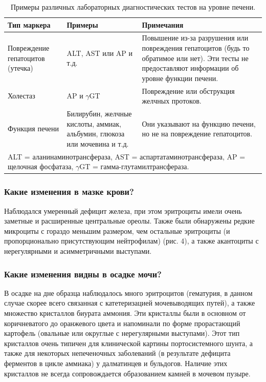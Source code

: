 \documentclass[a4paper,12pt]{book}
\begin{document}
\begin{table}[htbp]
\centering
\caption{Примеры различных лабораторных диагностических тестов на уровне печени.}
\begin{tabular}{p{3cm}p{4cm}p{7cm}}
\toprule
Тип маркера & Примеры & Примечания \\
\midrule
Повреждение гепатоцитов (утечка) & ALT, AST или AP и т.д. & Повышение из-за разрушения или повреждения гепатоцитов (будь то обратимое или нет). Эти тесты не предоставляют информации об уровне функции печени. \\
Холестаз & AP и $\gamma$GT & Повреждение или обструкция желчных протоков. \\
Функция печени & Билирубин, желчные кислоты, аммиак, альбумин, глюкоза или мочевина и т.д. & Они указывают на функцию печени, но не на повреждение гепатоцитов. \\
\bottomrule
\multicolumn{3}{l}{ALT = аланинаминотрансфераза, AST = аспартатаминотрансфераза, AP = щелочная фосфатаза, $\gamma$GT = гамма-глутамилтрансфераза.}
\end{tabular}
\end{table}

\subsubsection*{Какие изменения в мазке крови?}
Наблюдался умеренный дефицит железа, при этом эритроциты имели очень заметные и расширенные центральные ореолы. Также были обнаружены редкие микроциты с гораздо меньшим размером, чем остальные эритроциты (и пропорционально присутствующим нейтрофилам) (рис. 4), а также акантоциты с нерегулярными и асимметричными выступами.

\subsubsection*{Какие изменения видны в осадке мочи?}
В осадке на дне образца наблюдалось много эритроцитов (гематурия, в данном случае скорее всего связанная с катетеризацией мочевыводящих путей), а также множество кристаллов биурата аммония. Эти кристаллы были в основном от коричневатого до оранжевого цвета и напоминали по форме прорастающий картофель (овальные или округлые с нерегулярными выступами). Этот тип кристаллов очень типичен для клинической картины портосистемного шунта, а также для некоторых непеченочных заболеваний (в результате дефицита ферментов в цикле аммиака) у далматинцев и бульдогов. Наличие этих кристаллов не всегда сопровождается образованием камней в мочевом пузыре.
\end{document}
